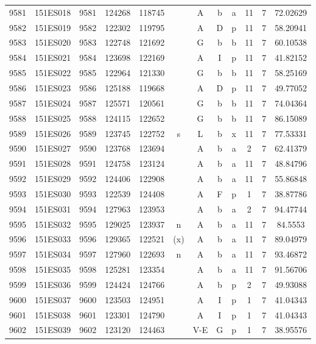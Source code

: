 \begin{tabular}{|*{12}{c|}}
9581 & 151ES018 & 9581 & 124268 & 118745 &  & A & b & a & 11 & 7 & 72.02629 \\ 
9582 & 151ES019 & 9582 & 122302 & 119795 &  & A & D & p & 11 & 7 & 58.20941 \\ 
9583 & 151ES020 & 9583 & 122748 & 121692 &  & G & b & b & 11 & 7 & 60.10538 \\ 
9584 & 151ES021 & 9584 & 123698 & 122169 &  & A & I & p & 11 & 7 & 41.82152 \\ 
9585 & 151ES022 & 9585 & 122964 & 121330 &  & G & b & b & 11 & 7 & 58.25169 \\ 
9586 & 151ES023 & 9586 & 125188 & 119668 &  & A & D & p & 11 & 7 & 49.77052 \\ 
9587 & 151ES024 & 9587 & 125571 & 120561 &  & G & b & b & 11 & 7 & 74.04364 \\ 
9588 & 151ES025 & 9588 & 124115 & 122652 &  & G & b & b & 11 & 7 & 86.15089 \\ 
9589 & 151ES026 & 9589 & 123745 & 122752 & s & L & b & x & 11 & 7 & 77.53331 \\ 
9590 & 151ES027 & 9590 & 123768 & 123694 &  & A & b & a & 2 & 7 & 62.41379 \\ 
9591 & 151ES028 & 9591 & 124758 & 123124 &  & A & b & a & 11 & 7 & 48.84796 \\ 
9592 & 151ES029 & 9592 & 124406 & 122908 &  & A & b & a & 11 & 7 & 55.86848 \\ 
9593 & 151ES030 & 9593 & 122539 & 124408 &  & A & F & p & 1 & 7 & 38.87786 \\ 
9594 & 151ES031 & 9594 & 127963 & 123953 &  & A & b & a & 2 & 7 & 94.47744 \\ 
9595 & 151ES032 & 9595 & 129025 & 123937 & n & A & b & a & 11 & 7 & 84.5553 \\ 
9596 & 151ES033 & 9596 & 129365 & 122521 & (x) & A & b & a & 11 & 7 & 89.04979 \\ 
9597 & 151ES034 & 9597 & 127960 & 122693 & n & A & b & a & 11 & 7 & 93.46872 \\ 
9598 & 151ES035 & 9598 & 125281 & 123354 &  & A & b & a & 11 & 7 & 91.56706 \\ 
9599 & 151ES036 & 9599 & 124424 & 124766 &  & A & b & p & 2 & 7 & 49.93088 \\ 
9600 & 151ES037 & 9600 & 123503 & 124951 &  & A & I & p & 1 & 7 & 41.04343 \\ 
9601 & 151ES038 & 9601 & 123301 & 124790 &  & A & I & p & 1 & 7 & 41.04343 \\ 
9602 & 151ES039 & 9602 & 123120 & 124463 &  & V-E & G & p & 1 & 7 & 38.95576 \\ 

\end{tabular}
